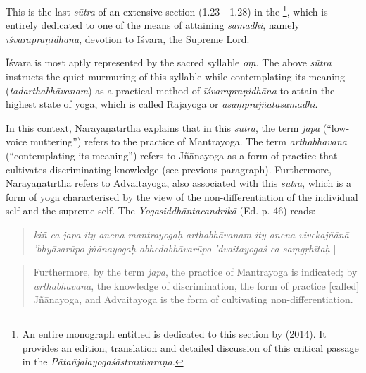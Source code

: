 This is the last \textit{sūtra} of an extensive section (1.23 - 1.28) in the \footnote{An entire monograph entitled  is dedicated to this section by \citeauthor{harimoto2014} (2014). It provides an edition, translation and detailed discussion of this critical passage in the \textit{Pātañjalayogaśāstravivaraṇa}.}, which is entirely dedicated to one of the means of attaining \textit{samādhi}, namely \textit{īśvarapraṇidhāna}, devotion to Īśvara, the Supreme Lord.

Īśvara is most aptly represented by the sacred syllable \textit{oṃ}. The above \textit{sūtra} instructs the quiet murmuring of this syllable while contemplating its meaning (\textit{tadarthabhāvanam}) as a practical method of \textit{īśvarapraṇidhāna} to attain the highest state of yoga, which is called Rājayoga or \textit{asaṃprajñātasamādhi}.

In this context, Nārāyaṇatīrtha explains that in this \textit{sūtra}, the term \textit{japa} (``low-voice muttering'') refers to the practice of Mantrayoga. The term \textit{arthabhavana} (``contemplating its meaning'') refers to Jñānayoga as a form of practice that cultivates discriminating knowledge (see previous paragraph). Furthermore, Nārāyaṇatīrtha refers to Advaitayoga, also associated with this \textit{sūtra}, which is a form of yoga characterised by the view of the non-differentiation of the individual self and the supreme self. The \textit{Yogasiddhāntacandrikā} (Ed. p. 46) reads:
\begin{quote}
  \textit{kiñ ca japa ity anena mantrayogaḥ arthabhāvanam ity anena vivekajñānā 'bhyāsarūpo jñānayogaḥ abhedabhāvarūpo 'dvaitayogaś ca saṃgṛhītaḥ} |
\end{quote}
\begin{quote}
Furthermore, by the term \textit{japa}, the practice of Mantrayoga is indicated; by \textit{arthabhavana}, the knowledge of discrimination, the form of practice [called] Jñānayoga, and Advaitayoga is the form of cultivating non-differentiation.
\end{quote}

